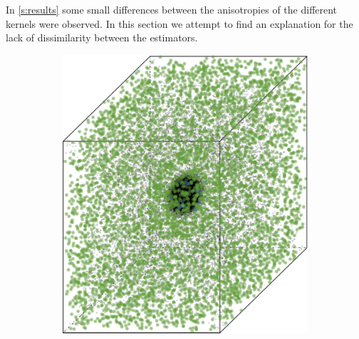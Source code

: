 
	In \cref{s:results} some small differences between the anisotropies of the different kernels were observed. In this section we attempt to find an explanation for the lack of dissimilarity between the estimators.

			\begin{figure}
				\centering
				\begin{subfigure}{0.23\textwidth}
					\centering
					\includegraphics[keepaspectratio=true, width=\textwidth, height=0.23\textheight]{discussion/img/ferdosi_1_60000_anisotropy.png}
					\caption{}
					\label{fig:discussion:anisotropy:ferdosi1}
				\end{subfigure}
				\begin{subfigure}{0.23\textwidth}
					\centering

\end{subfigure}
\end{figure}
